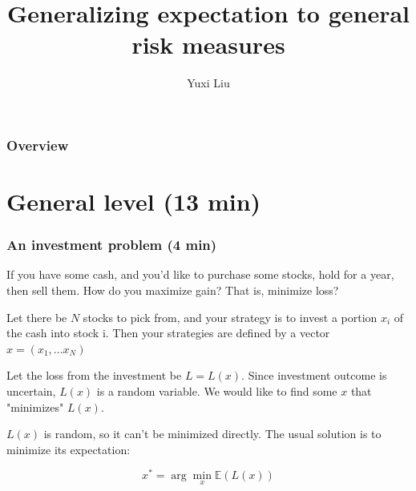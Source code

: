 \documentclass{beamer}
\title[Short title]{Generalizing expectation to general risk measures} %
\author{Yuxi Liu} %
\institute[ANU] %
{
Australian National University \\ %
\medskip
}
\date{\displaydate{date}}
\newcommand{\E}{\ensuremath{\mathbb{E}}}
\begin{document}
\begin{frame}
\titlepage
\end{frame}

\begin{frame}
\frametitle{Overview}
\tableofcontents
\end{frame}


\section{General level (13 min)}

\begin{frame}
\frametitle{An investment problem (4 min)}
	If you have some cash, and you'd like to purchase some stocks, hold for a year, then sell them. How do you maximize gain? That is, minimize loss?
	\pause
	
	Let there be $N$ stocks to pick from, and your strategy is to invest a portion $x_i$ of the cash into stock i. Then your strategies are defined by a vector $x = (x_1, ... x_N)$\pause
	
	Let the loss from the investment be $L = L(x)$. Since investment outcome is uncertain, $L(x)$ is a random variable. We would like to find some $x$ that "minimizes" $L(x)$.\pause
	
	$L(x)$ is random, so it can't be minimized directly. The usual solution is to minimize its expectation:

	$$x^* = \arg\min_x\E(L(x))$$
\end{frame}
\end{document}
